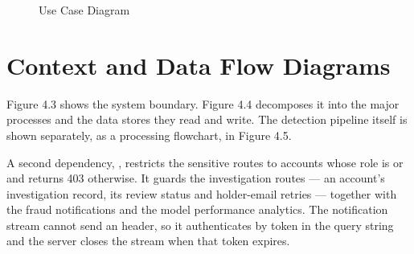 \documentclass[12pt,a4paper,oneside]{report}
\begin{document}
\setcounter{chapter}{4}\setcounter{section}{3}\setcounter{figure}{1}
\begin{figure}[H]
\centering
{}
\caption{Use Case Diagram}
\end{figure}

\section{Context and Data Flow Diagrams}
Figure 4.3 shows the system boundary. Figure 4.4 decomposes it into the major processes and the data stores they read and write. The detection pipeline itself is shown separately, as a processing flowchart, in Figure 4.5.
\clearpage

A second dependency, , restricts the sensitive routes to accounts whose role is  or  and returns 403 otherwise. It guards the investigation routes --- an account's investigation record, its review status and holder-email retries --- together with the fraud notifications and the model performance analytics. The notification stream cannot send an  header, so it authenticates by token in the query string and the server closes the stream when that token expires.
\clearpage

\setcounter{chapter}{4}\setcounter{figure}{9}
\clearpage

\makeatletter
{}
\makeatother
\clearpage
\end{document}
